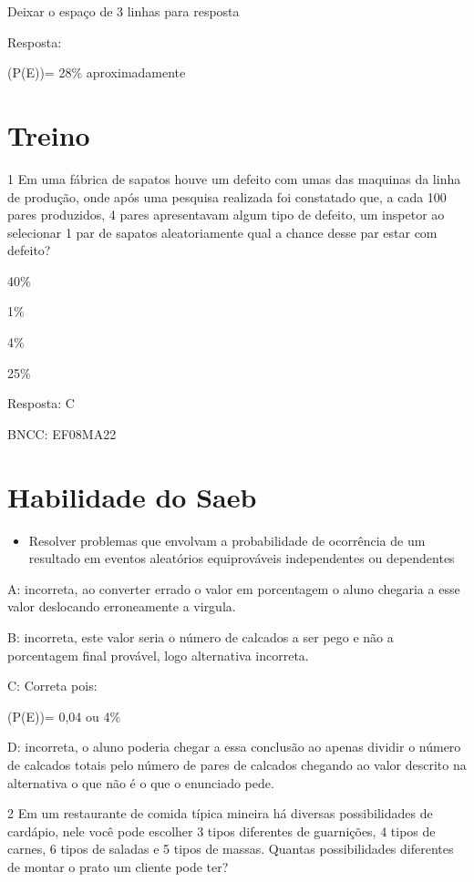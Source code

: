 Deixar o espaço de 3 linhas para resposta

Resposta:

(P(E))= 28\% aproximadamente

\section{Treino}

\num{1} Em uma fábrica de sapatos houve um defeito com umas das maquinas da
linha de produção, onde após uma pesquisa realizada foi constatado que,
a cada 100 pares produzidos, 4 pares apresentavam algum tipo de defeito,
um inspetor ao selecionar 1 par de sapatos aleatoriamente qual a chance
desse par estar com defeito?

\item 40\%
\item 1\%
\item 4\%
\item 25\%

Resposta: C

BNCC: EF08MA22

\section{Habilidade do Saeb}

\begin{itemize}
\tightlist

\item 
  Resolver problemas que envolvam a probabilidade de ocorrência de um
  resultado em eventos aleatórios equiprováveis independentes ou
  dependentes
\end{itemize}

A: incorreta, ao converter errado o valor em porcentagem o aluno
chegaria a esse valor deslocando erroneamente a virgula.

B: incorreta, este valor seria o número de calcados a ser pego e não a
porcentagem final provável, logo alternativa incorreta.

C: Correta pois:

(P(E))= 0,04 ou 4\%

D: incorreta, o aluno poderia chegar a essa conclusão ao apenas dividir
o número de calcados totais pelo número de pares de calcados chegando ao
valor descrito na alternativa o que não é o que o enunciado pede.

\num{2} Em um restaurante de comida típica mineira há diversas possibilidades
de cardápio, nele você pode escolher 3 tipos diferentes de guarnições, 4
tipos de carnes, 6 tipos de saladas e 5 tipos de massas. Quantas
possibilidades diferentes de montar o prato um cliente pode ter?

